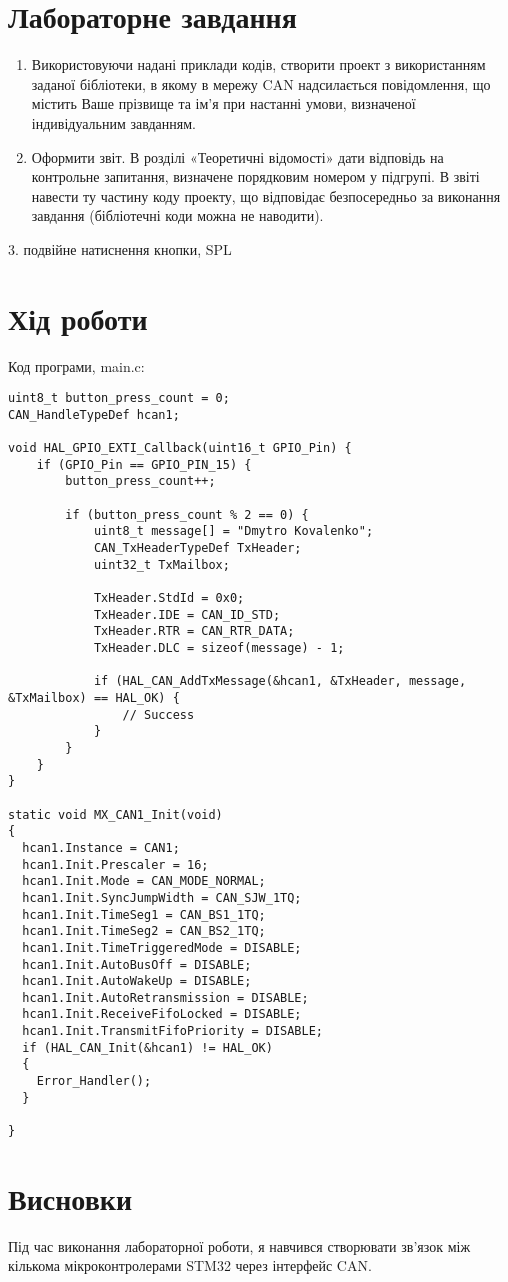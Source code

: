\documentclass[oneside,14pt]{extarticle}
\begin{document}
\begin{normalsize}
  \section*{Лабораторне завдання}
  \begin{enumerate}
  	\item Використовуючи надані приклади кодів, створити проект з використанням
заданої бібліотеки, в якому в мережу CAN надсилається повідомлення, що
містить Ваше прізвище та ім'я при настанні умови, визначеної
індивідуальним завданням.
\item Оформити звіт. В розділі «Теоретичні відомості» дати відповідь на
контрольне запитання, визначене порядковим номером у підгрупі. В звіті
навести ту частину коду проекту, що відповідає безпосередньо за виконання
завдання (бібліотечні коди можна не наводити).
  \end{enumerate}
  
  3. подвійне натиснення кнопки, SPL
  
  \section*{Хід роботи}
  
  Код програми, main.c:
  
	{\small\begin{lstlisting}
uint8_t button_press_count = 0;
CAN_HandleTypeDef hcan1;

void HAL_GPIO_EXTI_Callback(uint16_t GPIO_Pin) {
    if (GPIO_Pin == GPIO_PIN_15) {
        button_press_count++;

        if (button_press_count % 2 == 0) {
            uint8_t message[] = "Dmytro Kovalenko";
            CAN_TxHeaderTypeDef TxHeader;
            uint32_t TxMailbox;

            TxHeader.StdId = 0x0;
            TxHeader.IDE = CAN_ID_STD;
            TxHeader.RTR = CAN_RTR_DATA;
            TxHeader.DLC = sizeof(message) - 1;

            if (HAL_CAN_AddTxMessage(&hcan1, &TxHeader, message, &TxMailbox) == HAL_OK) {
                // Success
            }
        }
    }
}

static void MX_CAN1_Init(void)
{
  hcan1.Instance = CAN1;
  hcan1.Init.Prescaler = 16;
  hcan1.Init.Mode = CAN_MODE_NORMAL;
  hcan1.Init.SyncJumpWidth = CAN_SJW_1TQ;
  hcan1.Init.TimeSeg1 = CAN_BS1_1TQ;
  hcan1.Init.TimeSeg2 = CAN_BS2_1TQ;
  hcan1.Init.TimeTriggeredMode = DISABLE;
  hcan1.Init.AutoBusOff = DISABLE;
  hcan1.Init.AutoWakeUp = DISABLE;
  hcan1.Init.AutoRetransmission = DISABLE;
  hcan1.Init.ReceiveFifoLocked = DISABLE;
  hcan1.Init.TransmitFifoPriority = DISABLE;
  if (HAL_CAN_Init(&hcan1) != HAL_OK)
  {
    Error_Handler();
  }

}\end{lstlisting}}
	
	\section*{Висновки}
	Під час виконання лабораторної роботи, я навчився створювати зв'язок між кількома мікроконтролерами STM32 через інтерфейс CAN.
	    
\end{normalsize}
\end{document}
